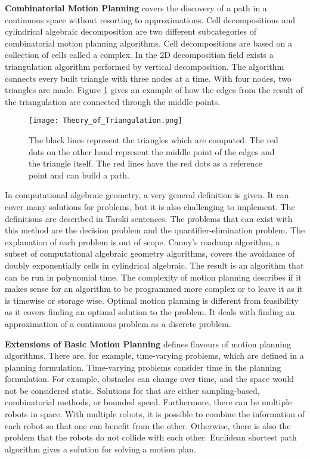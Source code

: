 \textbf{Combinatorial Motion Planning} covers the discovery of a path in a continuous space without resorting to approximations. Cell decompositions and cylindrical algebraic decomposition are two different subcategories of combinatorial motion planning algorithms. Cell decompositions are based on a collection of cells called a complex. In the 2D decomposition field exists a triangulation algorithm performed by vertical decomposition. The algorithm connects every built triangle with three nodes at a time. With four nodes, two triangles are made. Figure \ref{fig:Theory of Triangulation} gives an example of how the edges from the result of the triangulation are connected through the middle points.
\begin{figure}[H]
    \centering
    \texttt{[image: Theory\_of\_Triangulation.png]}
    \caption{The black lines represent the triangles which are computed. The red dots on the other hand represent the middle point of the edges and the triangle itself. The red lines have the red dots as a reference point and can build a path. \cite{planning_algorithms_steven_m_lavalle}}
    \label{fig:Theory of Triangulation}
\end{figure}
In computational algebraic geometry, a very general definition is given. It can cover many solutions for problems, but it is also challenging to implement. The definitions are described in Tarski sentences. The problems that can exist with this method are the decision problem and the quantifier-elimination problem. The explanation of each problem is out of scope. Canny's roadmap algorithm, a subset of computational algebraic geometry algorithms, covers the avoidance of doubly exponentially cells in cylindrical algebraic. \cite{constructing_roadmaps_of_semi-algebraic_sets_I} The result is an algorithm that can be run in polynomial time. The complexity of motion planning describes if it makes sense for an algorithm to be programmed more complex or to leave it as it is timewise or storage wise. Optimal motion planning is different from feasibility as it covers finding an optimal solution to the problem. It deals with finding an approximation of a continuous problem as a discrete problem. \cite{planning_algorithms_steven_m_lavalle}

\textbf{Extensions of Basic Motion Planning} defines flavours of motion planning algorithms. There are, for example, time-varying problems, which are defined in a planning formulation. Time-varying problems consider time in the planning formulation. For example, obstacles can change over time, and the space would not be considered static. Solutions for that are either sampling-based, combinatorial methods, or bounded speed. Furthermore, there can be multiple robots in space. With multiple robots, it is possible to combine the information of each robot so that one can benefit from the other. Otherwise, there is also the problem that the robots do not collide with each other. \cite{planning_algorithms_steven_m_lavalle} Euclidean shortest path algorithm gives a solution for solving a motion plan. \cite{efficient_computation_of_euclidean_shortest_paths_in_the_plane}

